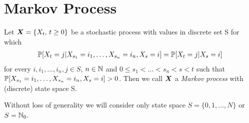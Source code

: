 \section{Markov Process}
\label{chap:basics}

\begin{definition}\label{markovChain}
	Let $\bm{X} = \{ X_t ,\, t \geq 0 \}$ be a stochastic process with values in discrete set S for which
	\begin{align}
		\operatorname{\mathbb{P}} [X_{t} = j \vert X_{s_1} = i_1 , \ldots  , X_{s_n} = i_n, X_{s} = i] = \operatorname{\mathbb{P}} [X_{t} = j \vert X_{s} = i]
	\label{markovProp}
	\end{align}
	for every $i , i_1 , \ldots  , i_n , j \in S$, $n \in \mathbb{N}$ and $0 \leq s_1<\ldots  < s_n < s < t$ such that $\operatorname{\mathbb{P}} [X_{s_1} = i_1 , \ldots  , X_{s_n} = i_n, X_{s} = i] > 0$. Then we call $\bm{X}$ a \emph{Markov process} with (discrete) state space S.
\end{definition}

Without loss of generality we will consider only state space $S = \{0 , 1 , \ldots  , N\}$ or $S = \mathbb{N}_0$.

